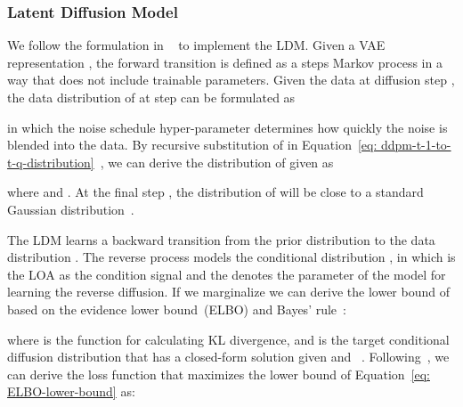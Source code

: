 \documentclass[lettersize,journal]{IEEEtran}
\begin{document}
\subsubsection{Latent Diffusion Model}
\noindent
We follow the formulation in ~\cite{DDPM} to implement the LDM. Given a VAE representation , the forward transition is defined as a  steps Markov process in a way that does not include trainable parameters. Given the data  at diffusion step , the data distribution of  at step  can be formulated as



\noindent
in which the noise schedule hyper-parameter  determines how quickly the noise is blended into the data. By recursive substitution of  in Equation~\eqref{eq: ddpm-t-1-to-t-q-distribution}~\cite{DDPM},  we can derive the distribution of  given  as




\noindent
where  and  . At the final step , the distribution of  will be close to a standard Gaussian distribution~\cite{DDPM}. 

The LDM learns a backward transition from the prior distribution  to the data distribution . The reverse process models the conditional distribution , in which  is the LOA as the condition signal and the  denotes the parameter of the model for learning the reverse diffusion. If we marginalize  we can derive the lower bound of  based on the evidence lower bound~(ELBO) and Bayes' rule~\cite{DDPM}:



\noindent
where  is the function for calculating KL divergence, and  is the target conditional diffusion distribution that has a closed-form solution given  and ~\cite{DDPM}.  Following~\cite{DDPM}, we can derive the loss function that maximizes the lower bound of Equation~\eqref{eq: ELBO-lower-bound} as:
\end{document}
